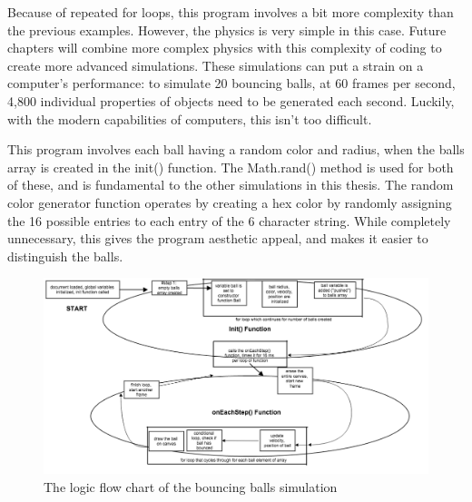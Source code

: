 Because of repeated for loops, this program involves a bit more complexity than the previous examples.  However, the physics is very simple in this case.  Future chapters will combine more complex physics with this complexity of coding to create more advanced simulations.  These simulations can put a strain on a computer's performance: to simulate 20  bouncing balls, at 60 frames per second, 4,800 individual properties of objects need to be generated each second.  Luckily, with the modern capabilities of computers, this isn't too difficult.  

This program involves each ball having a random color and radius, when the balls array is created in the init() function.  The Math.rand() method is used for both of these, and is fundamental to the other simulations in this thesis.  The random color generator function operates by creating a hex color by randomly assigning the 16 possible entries to each entry of the 6 character string.  While completely unnecessary, this gives the program aesthetic appeal, and makes it easier to distinguish the balls.

\begin{figure}[t]  
  \centering
  \includegraphics[width=15cm]{Figures/ballsbouncing.png}
  \caption{The logic flow chart of the bouncing balls simulation}
  \label{blah}
\end{figure}





































